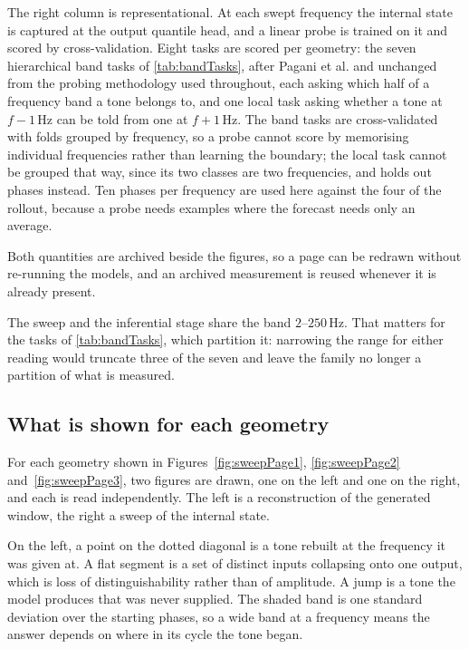 The right column is representational. At each swept frequency the internal state is captured at the output quantile head, and a linear probe is trained on it and scored by cross-validation. Eight tasks are scored per geometry: the seven hierarchical band tasks of \autoref{tab:bandTasks}, after Pagani et al.\autocite{paganiPreliminaryInsightsChronos2026} and unchanged from the probing methodology used throughout, each asking which half of a frequency band a tone belongs to, and one local task asking whether a tone at $f-1$\,Hz can be told from one at $f+1$\,Hz. The band tasks are cross-validated with folds grouped by frequency, so a probe cannot
score by memorising individual frequencies rather than learning the boundary; the local task cannot be grouped that way, since its two classes are two frequencies, and holds out phases instead. Ten
phases per frequency are used here against the four of the rollout, because a probe needs examples
where the forecast needs only an average.

Both quantities are archived beside the figures, so a page can be redrawn without re-running the
models, and an archived measurement is reused whenever it is already present.

The sweep and the inferential stage share the band $2$--$250$\,Hz. That matters for the tasks of \autoref{tab:bandTasks}, which partition it: narrowing the range for either reading would truncate three of the seven and leave the family no longer a partition of what is measured.

\subsection{What is shown for each geometry}

For each geometry shown in Figures~\ref{fig:sweepPage1}, \ref{fig:sweepPage2} and~\ref{fig:sweepPage3}, two figures are drawn, one on the left and one on the right, and each is read independently. The left is a reconstruction of the generated window, the right a sweep of the internal state.

On the left, a point on the dotted diagonal is a tone rebuilt at the frequency it was given at. A
flat segment is a set of distinct inputs collapsing onto one output, which is loss of
distinguishability rather than of amplitude. A jump is a tone the model produces that was never
supplied. The shaded band is one standard deviation over the starting phases, so a wide band at a
frequency means the answer depends on where in its cycle the tone began.

